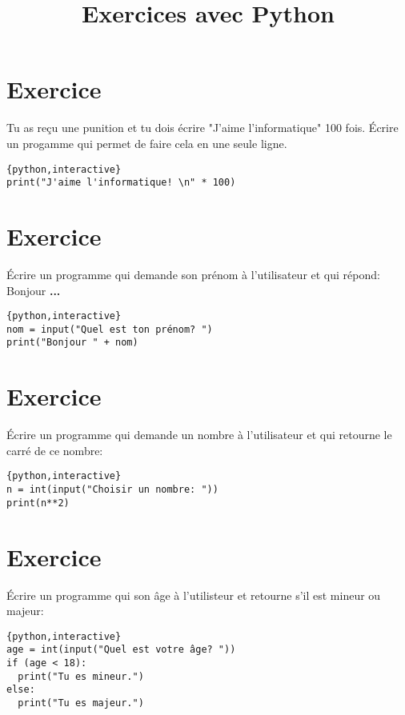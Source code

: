 \documentclass[a4paper,11pt]{article}
\begin{document}
\title{Exercices avec Python}
\date{}
\maketitle

\section{Exercice}
Tu as reçu une punition et tu dois écrire "J'aime l'informatique" 100 fois.
Écrire un progamme qui permet de faire cela en une seule ligne.
\begin{solution}
\begin{verbatim}{python,interactive}
print("J'aime l'informatique! \n" * 100)
\end{verbatim}
\end{solution}


\section{Exercice}
Écrire un programme qui demande son prénom à l'utilisateur et qui répond:\\
Bonjour \textbf{...}\\
\begin{solution}
\begin{verbatim}{python,interactive}
nom = input("Quel est ton prénom? ")
print("Bonjour " + nom)
\end{verbatim}
\end{solution}

\section{Exercice}
Écrire un programme qui demande un nombre à l'utilisateur et qui retourne le carré de ce nombre:\\
\begin{solution}
\begin{verbatim}{python,interactive}
n = int(input("Choisir un nombre: "))
print(n**2)
\end{verbatim}
\end{solution}

\section{Exercice}
Écrire un programme qui son âge à l'utilisteur et retourne s'il est mineur ou majeur:\\
\begin{solution}
\begin{verbatim}{python,interactive}
age = int(input("Quel est votre âge? "))
if (age < 18):
  print("Tu es mineur.")
else:
  print("Tu es majeur.")
\end{verbatim}
\end{solution}
\end{document}
